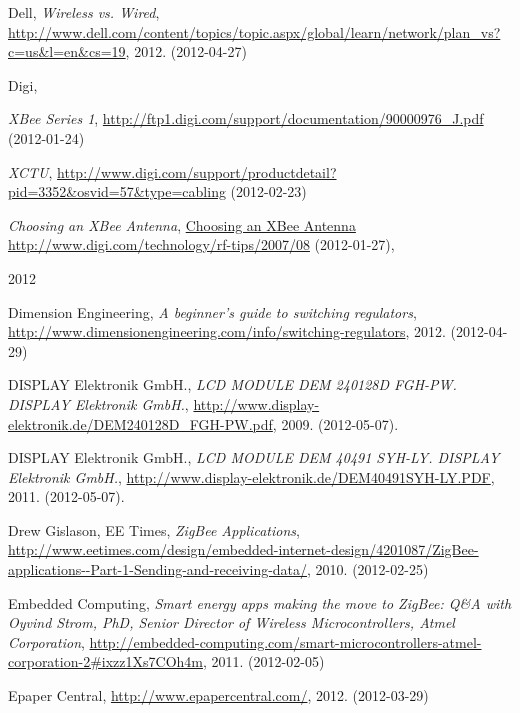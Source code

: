 \documentclass[a4paper,11pt]{article}
\newcounter{qcounter}
\begin{document}
\begin{thebibliography}{9}
\label{dell}
    Dell,
    \emph{Wireless vs. Wired},
    \url{http://www.dell.com/content/topics/topic.aspx/global/learn/network/plan_vs?c=us&l=en&cs=19},
    2012. (2012-04-27)

\label{digi}
    Digi,\\
    \begin{list}{[]}{}
    \item\emph{XBee Series 1},
    \url{http://ftp1.digi.com/support/documentation/90000976_J.pdf} (2012-01-24)
    \item \emph{XCTU},
    \url{http://www.digi.com/support/productdetail?pid=3352&osvid=57&type=cabling} (2012-02-23)
    \item \emph{Choosing an XBee Antenna},
    \url{Choosing an XBee Antenna http://www.digi.com/technology/rf-tips/2007/08} (2012-01-27),
    \end{list}
    2012

\label{dimension}
    Dimension Engineering,
    \emph{A beginner’s guide to switching regulators},
    \url{http://www.dimensionengineering.com/info/switching-regulators},
    2012. (2012-04-29)

\label{lcdalfa}
    DISPLAY Elektronik GmbH.,
    \emph{LCD MODULE DEM 240128D FGH-PW. DISPLAY Elektronik GmbH.},
    \url{http://www.display-elektronik.de/DEM240128D_FGH-PW.pdf},
    2009. (2012-05-07).

\label{lcdgraph}
    DISPLAY Elektronik GmbH.,
    \emph{LCD MODULE DEM 40491 SYH-LY. DISPLAY Elektronik GmbH.},
    \url{http://www.display-elektronik.de/DEM40491SYH-LY.PDF},
    2011. (2012-05-07).

\label{eetimes}
    Drew Gislason, 
    EE Times,
    \emph{ZigBee Applications},
    \url{ http://www.eetimes.com/design/embedded-internet-design/4201087/ZigBee-applications--Part-1-Sending-and-receiving-data/},
    2010. (2012-02-25)

\label{embedded}
    Embedded Computing,
    \emph{Smart energy apps making the move to ZigBee: Q\&A with Oyvind Strom, PhD, Senior Director of Wireless Microcontrollers, Atmel Corporation},
    \url{http://embedded-computing.com/smart-microcontrollers-atmel-corporation-2#ixzz1Xs7COh4m},
    2011. (2012-02-05)

\label{epapercentral}
    Epaper Central,
    \url{http://www.epapercentral.com/},
    2012. (2012-03-29)


\end{thebibliography}
\end{document}
